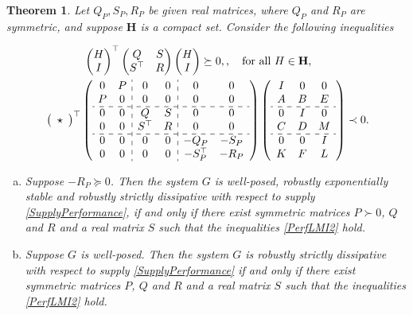\documentclass[11pt,a4paper,oneside,DIV=12,headings=small]{scrartcl}
\newtheorem{theorem}{Theorem}[section]
\theoremstyle{plain}
\begin{document}
\begin{theorem}
\label{PerformanceSProcedure}
Let $Q_P, S_P, R_P$ be given real matrices, where $Q_P$ and $R_P$ are symmetric, and suppose $\mathbf{H}$ is a compact set. Consider the following inequalities

\begin{subequations}
\label{PerfLMI2}
\begin{align}
 & \quad \quad \quad \,\,\, \begin{pmatrix} H \\ I \end{pmatrix}^\top
 \begin{pmatrix} Q & S \\ S^\top & R \end{pmatrix} 
 \begin{pmatrix} H \\ I \end{pmatrix} \succeq 0, , \quad \text{for all}\,\, H \in \mathbf{H},\label{PerfLMI2a} \\
&\left(\begin{array}{ccc} 
\star 
\end{array}\right)^\top
\left(\begin{array}{cc:cc:cc} 
0 & P & 0 & 0 & 0 & 0 \\ 
P & 0 & 0 & 0 & 0 & 0 \\ \hdashline 
0 & 0 & Q & S & 0 & 0 \\
0 & 0 & S^\top & R & 0 & 0 \\ \hdashline 
0 & 0 & 0 & 0 & -Q_P & -S_P \\
0 & 0 & 0 & 0 & -S_P^\top & -R_P
\end{array}\right)
\left(\begin{array}{ccc} 
I & 0 & 0 \\ 
A & B & E \\ \hdashline 
0 & I & 0 \\
C & D & M \\ \hdashline 
0 & 0 & I\\
K & F & L 
\end{array}\right) \prec 0.  \label{PerfLMI2b}
\end{align}
\end{subequations}
 
\begin{enumerate}[(a)]
\item Suppose $-R_P \succeq 0$. Then the system $G$ is well-posed, robustly exponentially stable and robustly strictly dissipative with respect to supply \eqref{SupplyPerformance}, if and only if there exist symmetric matrices $P\succ 0$, $Q$ and $R$ and a real matrix $S$ such that the inequalities \eqref{PerfLMI2} hold.
\item Suppose $G$ is well-posed. Then the system $G$ is robustly strictly dissipative with respect to supply \eqref{SupplyPerformance} if and only if there exist symmetric matrices $P$, $Q$ and $R$ and a real matrix $S$ such that the inequalities \eqref{PerfLMI2} hold.
\end{enumerate}
\end{theorem}
\end{document}
